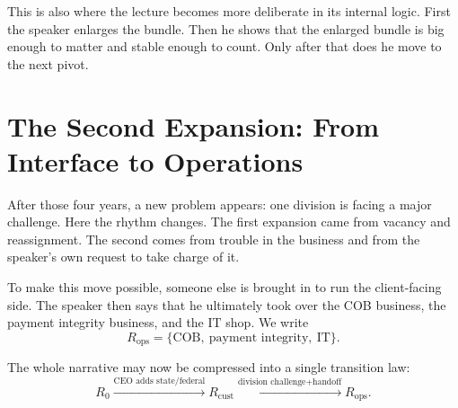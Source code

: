 This is also where the lecture becomes more deliberate in its internal logic. First the speaker enlarges the bundle. Then he shows that the enlarged bundle is big enough to matter and stable enough to count. Only after that does he move to the next pivot.

\section{The Second Expansion: From Interface to Operations}

After those four years, a new problem appears: one division is facing a major challenge. Here the rhythm changes. The first expansion came from vacancy and reassignment. The second comes from trouble in the business and from the speaker's own request to take charge of it.

To make this move possible, someone else is brought in to run the client-facing side. The speaker then says that he ultimately took over the COB business, the payment integrity business, and the IT shop. We write
\begin{equation}
R_{\mathrm{ops}} = \{\text{COB},\ \text{payment integrity},\ \text{IT}\}.
\end{equation}

The whole narrative may now be compressed into a single transition law:
\begin{equation}
R_0
\xrightarrow{\text{CEO adds state/federal}}
R_{\mathrm{cust}}
\xrightarrow{\text{division challenge}+\text{handoff}}
R_{\mathrm{ops}}.
\end{equation}

\begin{figure}
\begin{center}
\end{center}
\end{figure}

